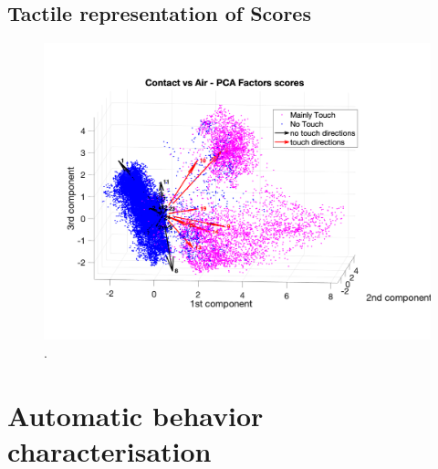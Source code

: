 \subsection{Tactile representation of Scores}
\begin{figure}[!h]
	\begin{center}
		\hspace*{\fill}
		\includegraphics[width=0.99\columnwidth]{fig/pca_touch_notouch_3d.png}
		\hspace*{\fill}
	\end{center}
	\caption{\label{fig:pca3d} .}
\end{figure}

\section{Automatic behavior characterisation}


